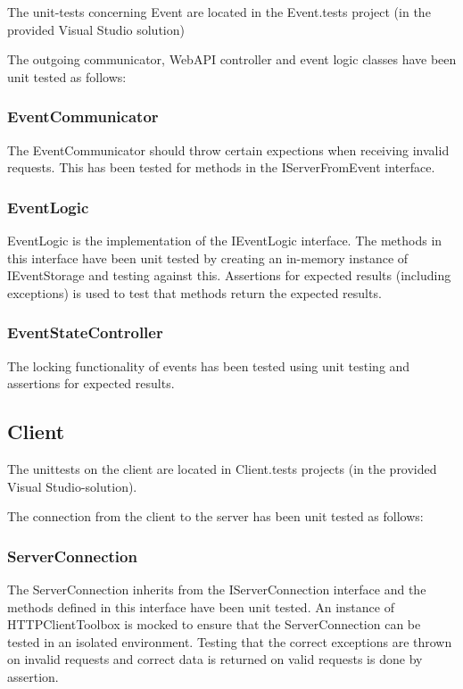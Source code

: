 The unit-tests concerning Event are located in the Event.tests project
(in the provided Visual Studio solution)

The outgoing communicator, WebAPI controller and event logic classes
have been unit tested as follows:

\subsubsection{EventCommunicator}\label{eventcommunicator}

The EventCommunicator should throw certain expections when receiving
invalid requests. This has been tested for methods in the
IServerFromEvent interface.

\subsubsection{EventLogic}\label{eventlogic}

EventLogic is the implementation of the IEventLogic interface. The
methods in this interface have been unit tested by creating an in-memory
instance of IEventStorage and testing against this. Assertions for
expected results (including exceptions) is used to test that methods
return the expected results.

\subsubsection{EventStateController}\label{eventstatecontroller}

The locking functionality of events has been tested using unit testing
and assertions for expected results.

\subsection{Client}\label{client-1}

The unittests on the client are located in Client.tests projects (in the
provided Visual Studio-solution).

The connection from the client to the server has been unit tested as
follows:

\subsubsection{ServerConnection}\label{serverconnection}

The ServerConnection inherits from the IServerConnection interface and
the methods defined in this interface have been unit tested. An instance
of HTTPClientToolbox is mocked to ensure that the ServerConnection can
be tested in an isolated environment. Testing that the correct
exceptions are thrown on invalid requests and correct data is returned
on valid requests is done by assertion.

